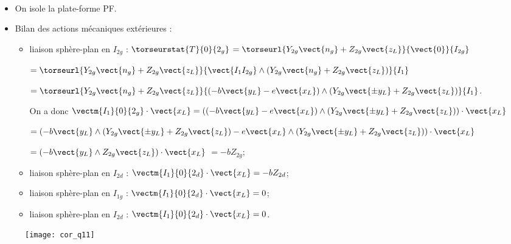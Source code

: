 \ifprof
\begin{corrige}~\\
\begin{minipage}[c]{.47\linewidth}
\begin{itemize}
\item On isole la plate-forme PF. 
\item Bilan des actions mécaniques extérieures : 
\begin{itemize}
\item liaison sphère-plan en $I_{2g}$ : $\torseurstat{T}{0}{2_g}$ 
$=\torseurl{Y_{2g}\vect{n_g}+Z_{2g}\vect{z_L}}{\vect{0}}{I_{2g}}$

$=\torseurl{Y_{2g}\vect{n_g}+Z_{2g}\vect{z_L}}{\vect{I_1I_{2g}}\wedge \left( Y_{2g}\vect{n_g}+Z_{2g}\vect{z_L} \right)}{I_{1}}$

$=\torseurl{Y_{2g}\vect{n_g}+Z_{2g}\vect{z_L}}{\left(-b\vect{y_L}-e\vect{x_L} \right)\wedge \left( Y_{2g}\vect{\pm y_L}+Z_{2g}\vect{z_L} \right)}{I_{1}}$.

On a donc $\vectm{I_1}{0}{2_g}\cdot \vect{x_L}=\left( \left(-b\vect{y_L}-e\vect{x_L} \right)\wedge \left( Y_{2g}\vect{\pm y_L}+Z_{2g}\vect{z_L} \right)\right) \cdot \vect{x_L}$

$= \left(-b\vect{y_L}\wedge \left( Y_{2g}\vect{\pm y_L}+Z_{2g}\vect{z_L} \right)-e\vect{x_L} \wedge \left( Y_{2g}\vect{\pm y_L}+Z_{2g}\vect{z_L} \right)\right) \cdot \vect{x_L}$

$= \left(-b\vect{y_L}\wedge  Z_{2g}\vect{z_L} \right) \cdot \vect{x_L}$
$= -b Z_{2g}$;

\item liaison sphère-plan en $I_{2d}$ :
 $\vectm{I_1}{0}{2_d}\cdot \vect{x_L}=-bZ_{2d} $;
\item liaison sphère-plan en $I_{1g}$ :
 $\vectm{I_1}{0}{2_d}\cdot \vect{x_L}=0$;
  \item liaison sphère-plan en $I_{2d}$ :
 $\vectm{I_1}{0}{2_d}\cdot \vect{x_L}=0$.
\end{itemize}
\end{itemize}
\end{minipage} \hfill
\begin{minipage}[c]{.47\linewidth}
\begin{figure}[H]
\centering
\texttt{[image: cor\_q11]}
\end{figure}
\end{minipage}


\end{corrige}
